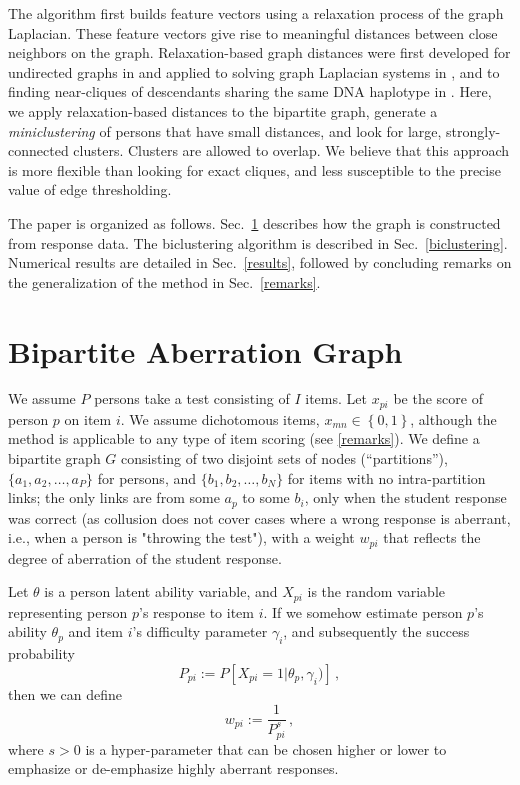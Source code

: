 \documentclass{article}
\begin{document}
The algorithm first builds feature vectors using a relaxation process of the graph Laplacian. These feature vectors give rise to meaningful distances between close neighbors on the graph. Relaxation-based graph distances were first developed for undirected graphs in \cite{safro} and applied to solving graph Laplacian systems in \cite{lamg}, and to finding near-cliques of descendants sharing the same DNA haplotype in \cite{primal}. Here, we apply relaxation-based distances to the bipartite graph, generate a {\it miniclustering} of persons that have small distances, and look for large, strongly-connected clusters. Clusters are allowed to overlap. We believe that this approach is more flexible than looking for exact cliques, and less susceptible to the precise value of edge thresholding.

The paper is organized as follows. Sec.~\ref{model} describes how the graph is constructed from response data. The biclustering algorithm is described in Sec.~\ref{biclustering}. Numerical results are detailed in Sec.~\ref{results}, followed by concluding remarks on the generalization of the method in Sec.~\ref{remarks}.

\section{Bipartite Aberration Graph}
\label{model}
We assume $P$ persons take a test consisting of $I$ items. Let $x_{pi}$ be the score of person $p$ on item $i$. We assume dichotomous items, $x_{mn} \in \left\{0,1\right\}$, although the method is applicable to any type of item scoring (see \ref{remarks}). We define a bipartite graph $G$ consisting of two disjoint sets of nodes (``partitions''), $\{a_1,a_2,\ldots,a_P\}$ for persons, and $\{b_1,b_2,\ldots,b_N\}$ for items with no intra-partition links; the only links are from some $a_p$ to some $b_i$, only when the student response was correct (as collusion does not cover cases where a wrong response is aberrant, i.e., when a person is "throwing the test"), with a weight $w_{pi}$ that reflects the degree of aberration of the student response.

Let $\theta$ is a person latent ability variable, and $X_{pi}$ is the random variable representing person $p$'s response to item $i$. If we somehow estimate person $p$'s ability $\theta_p$ and item $i$'s difficulty parameter $\gamma_i$, and subsequently the success probability
\begin{equation}
	P_{pi} := P \left [X_{pi}=1 | \theta_p, \gamma_i) \right]\,,
	\label{ppi} 
\end{equation}
then we can define
\begin{equation}
  w_{pi} := \frac{1}{P_{pi}^s} \,,
  \label{weight}
\end{equation}
where $s  > 0$ is a hyper-parameter that can be chosen higher or lower to emphasize or de-emphasize highly aberrant responses.
\end{document}
